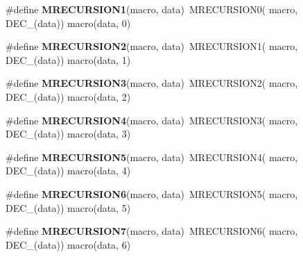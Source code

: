 \begin{DoxyCompactItemize}
\item 
\hypertarget{group__group__sam0__utils__mrecursion_ga4d17f2329e594db649138d290f5d2d4a}{}\#define {\bfseries M\+R\+E\+C\+U\+R\+S\+I\+O\+N1}(macro,  data)~M\+R\+E\+C\+U\+R\+S\+I\+O\+N0(  macro, D\+E\+C\+\_\+(data))   macro(data, 0)\label{group__group__sam0__utils__mrecursion_ga4d17f2329e594db649138d290f5d2d4a}

\item 
\hypertarget{group__group__sam0__utils__mrecursion_ga5c14a0930853fce143e73a967af2f58e}{}\#define {\bfseries M\+R\+E\+C\+U\+R\+S\+I\+O\+N2}(macro,  data)~M\+R\+E\+C\+U\+R\+S\+I\+O\+N1(  macro, D\+E\+C\+\_\+(data))   macro(data, 1)\label{group__group__sam0__utils__mrecursion_ga5c14a0930853fce143e73a967af2f58e}

\item 
\hypertarget{group__group__sam0__utils__mrecursion_ga591657f3397880d467cb1cf7d849e9a9}{}\#define {\bfseries M\+R\+E\+C\+U\+R\+S\+I\+O\+N3}(macro,  data)~M\+R\+E\+C\+U\+R\+S\+I\+O\+N2(  macro, D\+E\+C\+\_\+(data))   macro(data, 2)\label{group__group__sam0__utils__mrecursion_ga591657f3397880d467cb1cf7d849e9a9}

\item 
\hypertarget{group__group__sam0__utils__mrecursion_gafa90dcaff4712dd581f851333b6a7669}{}\#define {\bfseries M\+R\+E\+C\+U\+R\+S\+I\+O\+N4}(macro,  data)~M\+R\+E\+C\+U\+R\+S\+I\+O\+N3(  macro, D\+E\+C\+\_\+(data))   macro(data, 3)\label{group__group__sam0__utils__mrecursion_gafa90dcaff4712dd581f851333b6a7669}

\item 
\hypertarget{group__group__sam0__utils__mrecursion_ga1dd6877ec942c0477fc7bc042c1e49a4}{}\#define {\bfseries M\+R\+E\+C\+U\+R\+S\+I\+O\+N5}(macro,  data)~M\+R\+E\+C\+U\+R\+S\+I\+O\+N4(  macro, D\+E\+C\+\_\+(data))   macro(data, 4)\label{group__group__sam0__utils__mrecursion_ga1dd6877ec942c0477fc7bc042c1e49a4}

\item 
\hypertarget{group__group__sam0__utils__mrecursion_ga1f480bc10340c26db99a50459c790869}{}\#define {\bfseries M\+R\+E\+C\+U\+R\+S\+I\+O\+N6}(macro,  data)~M\+R\+E\+C\+U\+R\+S\+I\+O\+N5(  macro, D\+E\+C\+\_\+(data))   macro(data, 5)\label{group__group__sam0__utils__mrecursion_ga1f480bc10340c26db99a50459c790869}

\item 
\hypertarget{group__group__sam0__utils__mrecursion_gaa133958fec67ee617ecc14223418bb24}{}\#define {\bfseries M\+R\+E\+C\+U\+R\+S\+I\+O\+N7}(macro,  data)~M\+R\+E\+C\+U\+R\+S\+I\+O\+N6(  macro, D\+E\+C\+\_\+(data))   macro(data, 6)\label{group__group__sam0__utils__mrecursion_gaa133958fec67ee617ecc14223418bb24}


\end{DoxyCompactItemize}

